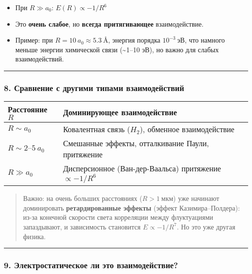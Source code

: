 \documentclass[11pt]{article}
\providecommand{\tightlist}{%
      \setlength{\itemsep}{0pt}\setlength{\parskip}{0pt}}
\begin{document}
\begin{itemize}
\tightlist
\item
  При \(R \gg a_0\): \(E(R) \propto -1/R^6\)
\item
  Это \textbf{очень слабое}, но \textbf{всегда притягивающее}
  взаимодействие.
\item
  Пример: при \(R = 10~a_0 \approx 5.3~\text{Å}\), энергия порядка
  \(10^{-3}~\text{эВ}\), что намного меньше энергии химической связи
  (\textasciitilde{}1--10 эВ), но важно для слабых взаимодействий.
\end{itemize}

\begin{center}\rule{0.5\linewidth}{\linethickness}\end{center}

\subsubsection{8. Сравнение с другими типами
взаимодействий}\label{ux441ux440ux430ux432ux43dux435ux43dux438ux435-ux441-ux434ux440ux443ux433ux438ux43cux438-ux442ux438ux43fux430ux43cux438-ux432ux437ux430ux438ux43cux43eux434ux435ux439ux441ux442ux432ux438ux439}

\begin{longtable}[]{@{}ll@{}}
\toprule
Расстояние \(R\) & Доминирующее взаимодействие\tabularnewline
\midrule
\endhead
\(R \sim a_0\) & Ковалентная связь (\(H_{2}\)), обменное
взаимодействие\tabularnewline
\(R \sim 2–5~a_0\) & Смешанные эффекты, отталкивание Паули,
притяжение\tabularnewline
\(R \gg a_0\) & Дисперсионное (Ван-дер-Ваальса) притяжение
\(\propto -1/R^6\)\tabularnewline
\bottomrule
\end{longtable}

\begin{quote}
Важно: на очень больших расстояниях (\(R > 1~\text{мкм}\)) уже начинают
доминировать \textbf{ретардированные эффекты} (эффект
Казимира--Полдера): из-за конечной скорости света корреляции между
флуктуациями запаздывают, и зависимость становится \(E \propto -1/R^7\).
Но это уже другая физика.
\end{quote}

\begin{center}\rule{0.5\linewidth}{\linethickness}\end{center}

\subsubsection{9. Электростатическое ли это
взаимодействие?}\label{ux44dux43bux435ux43aux442ux440ux43eux441ux442ux430ux442ux438ux447ux435ux441ux43aux43eux435-ux43bux438-ux44dux442ux43e-ux432ux437ux430ux438ux43cux43eux434ux435ux439ux441ux442ux432ux438ux435}
\end{document}
